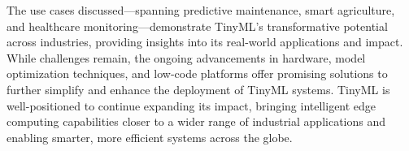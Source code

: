 \documentclass[twocolumn]{article}
\begin{document}
The use cases discussed—spanning predictive maintenance, smart agriculture, and healthcare monitoring—demonstrate TinyML's transformative potential across industries, providing insights into its real-world applications and impact. While challenges remain, the ongoing advancements in hardware, model optimization techniques, and low-code platforms offer promising solutions to further simplify and enhance the deployment of TinyML systems. TinyML is well-positioned to continue expanding its impact, bringing intelligent edge computing capabilities closer to a wider range of industrial applications and enabling smarter, more efficient systems across the globe.





\end{document}
